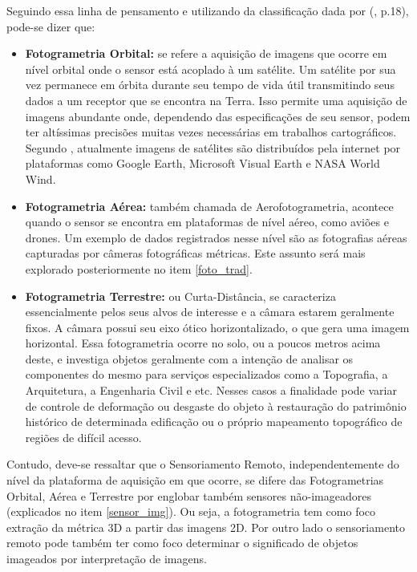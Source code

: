 Seguindo essa linha de pensamento e utilizando da classificação dada por  (\citeyear{coelho2007fotogrametria}, p.18), pode-se dizer que:
\begin{itemize}
    \item \textbf{Fotogrametria Orbital:} se refere a aquisição de imagens que ocorre em nível orbital onde o sensor está acoplado à um satélite. Um satélite por sua vez permanece em órbita durante seu tempo de vida útil transmitindo seus dados a um receptor que se encontra na Terra. Isso permite uma aquisição de imagens abundante onde, dependendo das especificações de seu sensor, podem ter altíssimas precisões muitas vezes necessárias em trabalhos cartográficos. Segundo , atualmente imagens de satélites são distribuídos pela internet por plataformas como Google Earth, Microsoft Visual Earth e NASA World Wind. 
    \item \textbf{Fotogrametria Aérea:} também chamada de Aerofotogrametria, acontece quando o sensor se encontra em plataformas de nível aéreo, como aviões e drones. Um exemplo de dados registrados nesse nível são as fotografias aéreas capturadas por câmeras fotográficas métricas. Este assunto será mais explorado posteriormente no item \ref{foto_trad}.
    \item \textbf{Fotogrametria Terrestre:} ou Curta-Distância, se caracteriza essencialmente pelos seus alvos de interesse e a câmara estarem geralmente fixos. A câmara possui seu eixo ótico horizontalizado, o que gera uma imagem horizontal. Essa fotogrametria ocorre no solo, ou a poucos metros acima deste, e investiga objetos geralmente com a intenção de analisar os componentes do mesmo para serviços especializados como a Topografia, a Arquitetura, a Engenharia Civil e etc. Nesses casos a finalidade pode variar de controle de deformação ou desgaste do objeto à restauração do patrimônio histórico de determinada edificação ou o próprio mapeamento topográfico de regiões de difícil acesso.  
\end{itemize}
Contudo, deve-se ressaltar que o Sensoriamento Remoto, independentemente do nível da plataforma de aquisição em que ocorre, se difere das Fotogrametrias Orbital, Aérea e Terrestre por englobar também sensores não-imageadores (explicados no item \ref{sensor_img}). Ou seja, a fotogrametria tem como foco extração da métrica 3D a partir das imagens 2D. Por outro lado o sensoriamento remoto pode também ter como foco determinar o significado de objetos imageados por interpretação de imagens. 

